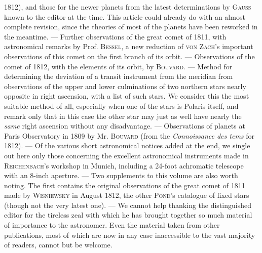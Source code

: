 1812), and those for the newer planets from the latest determinations by \textsc{Gauss} known to the editor at the time. This article could already do with an almost complete revision, since the theories of most of the planets have been reworked in the meantime. — Further observations of the great comet of 1811, with astronomical remarks by Prof. \textsc{Bessel}, a new reduction of \textsc{von Zach}'s important observations of this comet on the first branch of its orbit. — Observations of the comet of 1812, with the elements of its orbit, by \textsc{Bouvard}. — Method for determining the deviation of a transit instrument from the meridian from observations of the upper and lower culminations of two northern stars nearly opposite in right ascension, with a list of such stars. We consider this the most suitable method of all, especially when one of the stars is Polaris itself, and remark only that in this case the other star may just as well have nearly the \emph{same} right ascension without any disadvantage. — Observations of planets at Paris Observatory in 1809 by Mr. \textsc{Bouvard} (from the \emph{Connoissance des tems} for 1812). — Of the various short astronomical notices added at the end, we single out here only those concerning the excellent astronomical instruments made in \textsc{Reichenbach}'s workshop in Munich, including a 24-foot achromatic telescope with an 8-inch aperture. — Two supplements to this volume are also worth noting. The first contains the original observations of the great comet of 1811 made by \textsc{Wisniewsky} in August 1812, the other \textsc{Pond}'s catalogue of fixed stars (though not the very latest one). — We cannot help thanking the distinguished editor for the tireless zeal with which he has brought together so much material of importance to the astronomer. Even the material taken from other publications, most of which are now in any case inaccessible to the vast majority of readers, cannot but be welcome.
